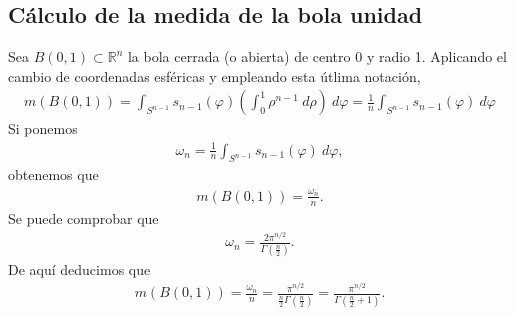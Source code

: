 \subsection{Cálculo de la medida de la bola unidad}
Sea $B(0,1) \subset \mathbb{R}^n$ la bola cerrada (o abierta) de centro 0 y radio 1. Aplicando el cambio de coordenadas esféricas y empleando esta útlima notación,
\begin{align*}
    m(B(0,1)) = \int_{S^{n-1}} s_{n-1}(\varphi)\left( \int_{0}^{1}{\rho^{n-1} \ d\rho} \right) \ d\varphi = \frac{1}{n}\int_{S^{n-1}} s_{n-1}(\varphi) \ d\varphi
\end{align*}
Si ponemos
\begin{align*}
    \omega_n = \frac{1}{n}\int_{S^{n-1}} s_{n-1}(\varphi) \ d\varphi,
\end{align*}
obtenemos que
\begin{align*}
    m(B(0,1)) = \frac{\omega_n}{n}.
\end{align*}
Se puede comprobar que
\begin{align*}
    \omega_n = \frac{2\pi^{n/2}}{\Gamma\left( \frac{n}{2} \right)}.
\end{align*}
De aquí deducimos que
\begin{align*}
    m(B(0,1)) = \frac{\omega_n}{n} = \frac{\pi^{n/2}}{\frac{n}{2} \Gamma\left( \frac{n}{2} \right)} = \frac{\pi^{n/2}}{\Gamma\left( \frac{n}{2} + 1 \right)}.
\end{align*}